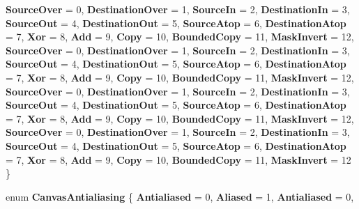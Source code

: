 \begin{DoxyCompactItemize}
{\bfseries Source\+Over} = 0, 
{\bfseries Destination\+Over} = 1, 
{\bfseries Source\+In} = 2, 
\newline
{\bfseries Destination\+In} = 3, 
{\bfseries Source\+Out} = 4, 
{\bfseries Destination\+Out} = 5, 
{\bfseries Source\+Atop} = 6, 
\newline
{\bfseries Destination\+Atop} = 7, 
{\bfseries Xor} = 8, 
{\bfseries Add} = 9, 
{\bfseries Copy} = 10, 
\newline
{\bfseries Bounded\+Copy} = 11, 
{\bfseries Mask\+Invert} = 12, 
{\bfseries Source\+Over} = 0, 
{\bfseries Destination\+Over} = 1, 
\newline
{\bfseries Source\+In} = 2, 
{\bfseries Destination\+In} = 3, 
{\bfseries Source\+Out} = 4, 
{\bfseries Destination\+Out} = 5, 
\newline
{\bfseries Source\+Atop} = 6, 
{\bfseries Destination\+Atop} = 7, 
{\bfseries Xor} = 8, 
{\bfseries Add} = 9, 
\newline
{\bfseries Copy} = 10, 
{\bfseries Bounded\+Copy} = 11, 
{\bfseries Mask\+Invert} = 12, 
{\bfseries Source\+Over} = 0, 
\newline
{\bfseries Destination\+Over} = 1, 
{\bfseries Source\+In} = 2, 
{\bfseries Destination\+In} = 3, 
{\bfseries Source\+Out} = 4, 
\newline
{\bfseries Destination\+Out} = 5, 
{\bfseries Source\+Atop} = 6, 
{\bfseries Destination\+Atop} = 7, 
{\bfseries Xor} = 8, 
\newline
{\bfseries Add} = 9, 
{\bfseries Copy} = 10, 
{\bfseries Bounded\+Copy} = 11, 
{\bfseries Mask\+Invert} = 12, 
\newline
{\bfseries Source\+Over} = 0, 
{\bfseries Destination\+Over} = 1, 
{\bfseries Source\+In} = 2, 
{\bfseries Destination\+In} = 3, 
\newline
{\bfseries Source\+Out} = 4, 
{\bfseries Destination\+Out} = 5, 
{\bfseries Source\+Atop} = 6, 
{\bfseries Destination\+Atop} = 7, 
\newline
{\bfseries Xor} = 8, 
{\bfseries Add} = 9, 
{\bfseries Copy} = 10, 
{\bfseries Bounded\+Copy} = 11, 
\newline
{\bfseries Mask\+Invert} = 12
 \}
\item 
\mbox{\label{namespace_microsoft_1_1_graphics_1_1_canvas_a3ca0365f7ca6c805554d000be051da7c}} 
enum {\bfseries Canvas\+Antialiasing} \{ \newline
{\bfseries Antialiased} = 0, 
{\bfseries Aliased} = 1, 
{\bfseries Antialiased} = 0, 

\end{DoxyCompactItemize}
